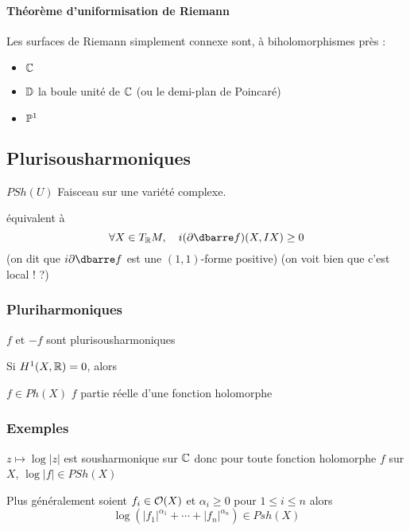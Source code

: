 \paragraph{Théorème 
d'uniformisation 
de Riemann}
\begin{thm}
Les surfaces de Riemann simplement connexe sont, à biholomorphismes près :
\begin{itemize}
\item $\mathbb{C}$
\item $\operatorname{\mathbb{D}}$ la boule unité de $\mathbb{C}$ (ou le demi-plan de Poincaré)
\item $\mathbb{P}^1$
\end{itemize}
\end{thm}

\subsection{Plurisousharmoniques}
$PSh(U)$
Faisceau sur une variété complexe.

équivalent à 
\begin{equation}
\forall X \in T_\R M, \quad i(\partial\dbarre f)(X,IX) \geq 0
\end{equation}
(on dit que $i\partial\dbarre f$ est une $(1,1)$-forme positive)
(on voit bien que c'est local ! ?)


\subsubsection{Pluriharmoniques}

$f$ et $-f$ sont plurisousharmoniques




Si $H^1(X,\mathbb{R}) = 0$, alors

$f \in Ph(X)$ \ssi $f$ partie réelle d'une fonction holomorphe

                        
                        
                        
                        
                        
                        



\subsubsection{Exemples}
$z\mapsto \log |z|$ est sousharmonique sur $\mathbb{C}$
donc pour toute fonction holomorphe $f$ sur $X$, $\log |f| \in PSh(X)$

Plus généralement soient $f_i \in \mathcal{O}(X)$ et $\alpha_i \geq 0$ pour $1 \leq i \leq n$ alors
\[
\log \left(
|f_1|^{\alpha_1} + \cdots + |f_n|^{\alpha_n}
\right) \in Psh(X)
\]


